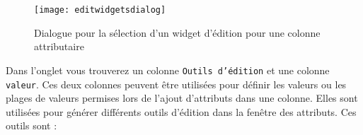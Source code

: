 
\begin{figure}[H]
   \begin{center}
   \texttt{[image: editwidgetsdialog]}
   \caption{Dialogue pour la sélection d'un widget d'édition pour une colonne 
    attributaire \nixcaption}\label{fig:editwidget}
\end{center}
\end{figure}

Dans l'onglet  vous trouverez un colonne \texttt{Outils d'édition} 
et une colonne \texttt{valeur}. Ces deux colonnes peuvent être utilisées pour 
définir les valeurs ou les plages de valeurs permises lors de l'ajout d'attributs 
dans une colonne. Elles sont utilisées pour générer différents outils d'édition 
dans la fenêtre des attributs. Ces outils sont :
